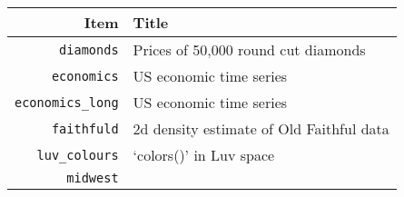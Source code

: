 \documentclass[]{book}
\begin{document}
\begin{enumerate}
  \begin{longtable}[]{@{}rl@{}}
  \toprule
  \begin{minipage}[b]{0.22\columnwidth}\raggedleft\strut
  Item\strut
  \end{minipage} &
  \begin{minipage}[b]{0.61\columnwidth}\raggedright\strut
  Title\strut
  \end{minipage}\tabularnewline
  \midrule
  \endhead
  \begin{minipage}[t]{0.22\columnwidth}\raggedleft\strut
  \texttt{diamonds}\strut
  \end{minipage} &
  \begin{minipage}[t]{0.61\columnwidth}\raggedright\strut
  Prices of 50,000 round cut diamonds\strut
  \end{minipage}\tabularnewline
  \begin{minipage}[t]{0.22\columnwidth}\raggedleft\strut
  \texttt{economics}\strut
  \end{minipage} &
  \begin{minipage}[t]{0.61\columnwidth}\raggedright\strut
  US economic time series\strut
  \end{minipage}\tabularnewline
  \begin{minipage}[t]{0.22\columnwidth}\raggedleft\strut
  \texttt{economics\_long}\strut
  \end{minipage} &
  \begin{minipage}[t]{0.61\columnwidth}\raggedright\strut
  US economic time series\strut
  \end{minipage}\tabularnewline
  \begin{minipage}[t]{0.22\columnwidth}\raggedleft\strut
  \texttt{faithfuld}\strut
  \end{minipage} &
  \begin{minipage}[t]{0.61\columnwidth}\raggedright\strut
  2d density estimate of Old Faithful data\strut
  \end{minipage}\tabularnewline
  \begin{minipage}[t]{0.22\columnwidth}\raggedleft\strut
  \texttt{luv\_colours}\strut
  \end{minipage} &
  \begin{minipage}[t]{0.61\columnwidth}\raggedright\strut
  `colors()' in Luv space\strut
  \end{minipage}\tabularnewline
  \begin{minipage}[t]{0.22\columnwidth}\raggedleft\strut
  \texttt{midwest}\strut
  \end{minipage} &

\end{longtable}
\end{enumerate}
\end{document}
